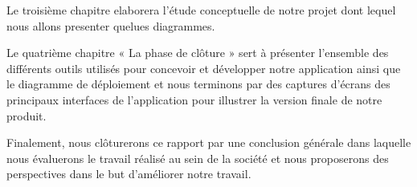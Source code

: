 Le troisième chapitre elaborera l’étude conceptuelle de notre projet dont lequel nous allons
presenter quelues diagrammes.

\medskip

Le quatrième chapitre « La phase de clôture » sert à présenter l’ensemble des différents outils
utilisés pour concevoir et développer notre application ainsi que le diagramme de déploiement
et nous terminons par des captures d’écrans des principaux interfaces de l’application pour
illustrer la version finale de notre produit.

\medskip

Finalement, nous clôturerons ce rapport par une conclusion générale dans laquelle nous évaluerons le travail réalisé au sein de la société et nous proposerons des perspectives dans le but
d’améliorer notre travail.
